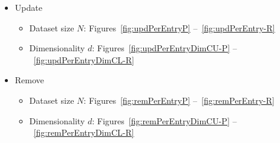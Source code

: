 \documentclass{vldb}
\begin{document}
\begin{itemize}
	\item Update %
	\begin{itemize}
		\item Dataset size $N$: Figures~\ref{fig:updPerEntryP} --~\ref{fig:updPerEntry-R}
		\item Dimensionality $d$: Figures~\ref{fig:updPerEntryDimCU-P} --~\ref{fig:updPerEntryDimCL-R}
	\end{itemize}
	
	\item Remove %
	\begin{itemize}
		\item Dataset size $N$: Figures~\ref{fig:remPerEntryP} --~\ref{fig:remPerEntry-R}
		\item Dimensionality $d$: Figures~\ref{fig:remPerEntryDimCU-P} --~\ref{fig:remPerEntryDimCL-R}
	\end{itemize}
\end{itemize}





\clearpage
\newpage



\clearpage
\newpage


\clearpage
\newpage


\clearpage
\newpage



\clearpage
\newpage



\clearpage
\newpage



\clearpage
\newpage



\clearpage
\newpage
\end{document}
